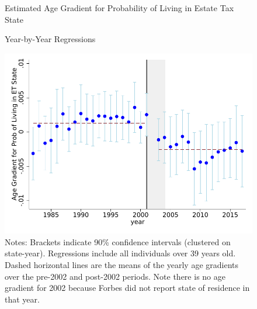 \documentclass[12pt]{article}
\begin{document}
\begin{figure}
	\centering
	\caption{Estimated Age Gradient for Probability of Living in Estate Tax State}	
	\caption*{Year-by-Year Regressions}
	\includegraphics[width=.8\textwidth]{../Figures/Figure7.pdf}
	\caption*{\footnotesize Notes: Brackets indicate 90\% confidence intervals (clustered on state-year). Regressions include all individuals over 39 years old. Dashed horizontal lines are the means of the yearly age gradients over the pre-2002 and post-2002 periods. Note there is no age gradient for 2002 because Forbes did not report state of residence in that year.}
\label{fig:AgeGradientByYear}
\end{figure}



\clearpage
\end{document}
